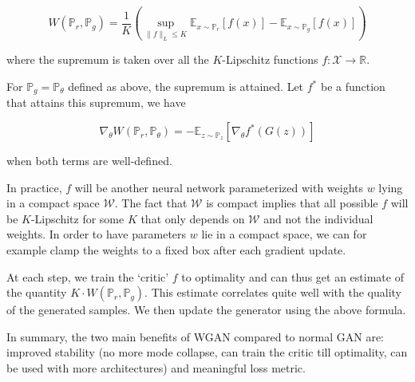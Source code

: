 \[
  W(\mathbb{P}_r, \mathbb{P}_g)
  = \frac{1}{K} \left( \sup_{\|f\|_L \le K}
  \mathbb{E}_{x\sim\mathbb{P}_r}[f(x)] - \mathbb{E}_{x\sim\mathbb{P}_g}[f(x)]
  \right)
\]

where the supremum is taken over all the $K$-Lipschitz functions
$f: \mathcal{X} \rightarrow \mathbb{R}$.

For $\mathbb{P}_g = \mathbb{P}_{\theta}$ defined as above, the supremum is
attained. Let $f^*$ be a function that attains this supremum, we have

\[
  \nabla_{\theta}W(\mathbb{P}_r, \mathbb{P}_{\theta})
  = -\mathbb{E}_{z\sim\mathbb{P}_z}[\nabla_{\theta}f^*(G(z))]
\]

when both terms are well-defined.

In practice, $f$ will be another neural network parameterized with weights $w$
lying in a compact space $\mathcal{W}$. The fact that $\mathcal{W}$ is compact
implies that all possible $f$ will be $K$-Lipschitz for some $K$ that only
depends on $\mathcal{W}$ and not the individual weights. In order to have
parameters $w$ lie in a compact space, we can for example clamp the weights to
a fixed box after each gradient update.

At each step, we train the `critic' $f$ to optimality and can thus get an
estimate of the quantity $K \cdot W(\mathbb{P}_r, \mathbb{P}_g)$. This
estimate correlates quite well with the quality of the generated samples.
We then update the generator using the above formula.

In summary, the two main benefits of WGAN compared to normal GAN are:
improved stability (no more mode collapse, can train the critic till
optimality, can be used with more architectures) and meaningful loss metric.

